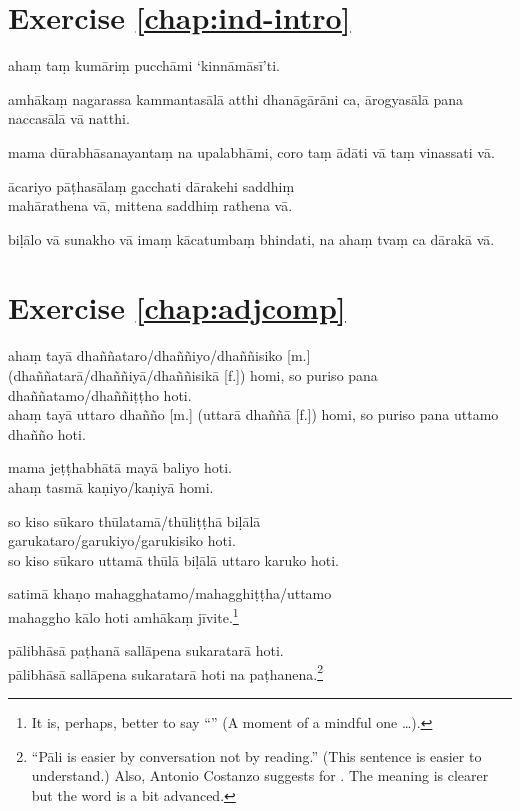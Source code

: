 \section*{Exercise \ref{chap:ind-intro}}
\begin{answerkey}
\item aha\d m ta\d m kum\=ari\d m pucch\=ami `kinn\=am\=as\=i'ti.
\item amh\=aka\d m nagarassa kammantas\=al\=a atthi dhan\=ag\=ar\=ani ca, \=arogyas\=al\=a pana naccas\=al\=a v\=a natthi.
\item mama d\=urabh\=asanayanta\d m na upalabh\=ami, coro ta\d m \=ad\=ati v\=a ta\d m vinassati v\=a.
\item \=acariyo p\=a\d thas\=ala\d m gacchati d\=arakehi saddhi\d m \\mah\=arathena v\=a, mittena saddhi\d m rathena v\=a.
\item bi\d l\=alo v\=a sunakho v\=a ima\d m k\=acatumba\d m bhindati, na aha\d m tva\d m ca d\=arak\=a v\=a.
\end{answerkey}

\section*{Exercise \ref{chap:adjcomp}}
\begin{answerkey}
\item aha\d m tay\=a dha\~n\~nataro/dha\~n\~niyo/dha\~n\~nisiko [m.] \\(dha\~n\~natar\=a/dha\~n\~niy\=a/dha\~n\~nisik\=a [f.]) homi, so puriso pana dha\~n\~natamo/dha\~n\~ni\d t\d tho hoti. \\aha\d m tay\=a uttaro dha\~n\~no [m.] (uttar\=a dha\~n\~n\=a [f.]) homi, so puriso pana uttamo dha\~n\~no hoti.
\item mama je\d t\d thabh\=at\=a may\=a baliyo hoti. \\aha\d m tasm\=a ka\d niyo/ka\d niy\=a homi.
\item so kiso s\=ukaro th\=ulatam\=a/th\=uli\d t\d th\=a bi\d l\=al\=a \\garukataro/garukiyo/garukisiko hoti. \\so kiso s\=ukaro uttam\=a th\=ul\=a bi\d l\=al\=a uttaro karuko hoti.
\item satim\=a kha\d no mahagghatamo/mahagghi\d t\d tha/uttamo \\mahaggho k\=alo hoti amh\=aka\d m j\=ivite.\footnote{It is, perhaps, better to say ``'' (A moment of a mindful one \ldots).}
\item p\=alibh\=as\=a pa\d than\=a sall\=apena sukaratar\=a hoti. \\p\=alibh\=as\=a sall\=apena sukaratar\=a hoti na pa\d thanena.\footnote{``P\=ali is easier by conversation not by reading.'' (This sentence is easier to understand.) Also, Antonio Costanzo suggests  for . The meaning is clearer but the word is a bit advanced.}
\end{answerkey}

